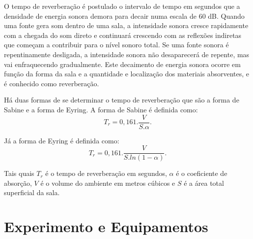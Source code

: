 O tempo de reverberação é postulado o intervalo de tempo em segundos que a densidade de energia sonora demora para decair numa escala de 60 dB. Quando uma fonte gera som dentro de uma sala, a intensidade sonora cresce rapidamente com a chegada do som direto e continuará crescendo com as reflexões indiretas que começam a contribuir para o nível sonoro total. Se uma fonte sonora é repentinamente desligada, a intensidade sonora não desaparecerá de repente, mas vai enfraquecendo gradualmente. Este decaimento de energia sonora ocorre em função da forma da sala e a quantidade e localização dos materiais absorventes, e é conhecido como reverberação.

Há duas formas de se determinar o tempo de reverberação que são a forma de Sabine e a forma de Eyring. A forma de Sabine é definida como:
\begin{equation}
	T_{r}= 0,161 . \frac{V}{S . \alpha}.
\label{eq.relpotencia}
\end{equation}

Já a forma de Eyring é definida como:
\begin{equation}
	T_{r}= 0,161 . \frac{V}{S . ln (1 - \alpha)}.
\label{eq.relpotencia}
\end{equation}

Tais quais $T_{r}$ é o tempo de reverberação em segundos, $\alpha$  é o coeficiente de absorção, $V$ é o volume do ambiente em metros cúbicos e $S$ é a área total superficial da sala.

\chapter{Experimento e Equipamentos}\label{descricao}

